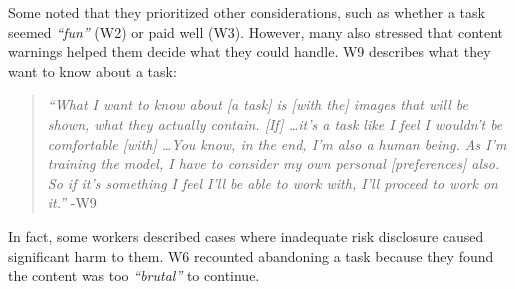  Some noted that they prioritized other considerations, such as whether a task seemed \textit{``fun''} (W2) or paid well (W3). However, many also stressed that content warnings helped them decide what they could handle. W9 describes what they want to know about a task:
\begin{quote}
    \textit{``What I want to know about [a task] is [with the] images that will be shown, what they actually contain. [If] \dots it's a task like I feel I wouldn't be comfortable [with] \dots You know, in the end, I'm also a human being. As I'm training the model, I have to consider my own personal [preferences] also. So if it's something I feel I'll be able to work with, I'll proceed to work on it.''} -W9
\end{quote}
In fact, some workers described cases where inadequate risk disclosure caused significant harm to them. W6 recounted abandoning a task because they found the content was too \textit{``brutal''} to continue. 

